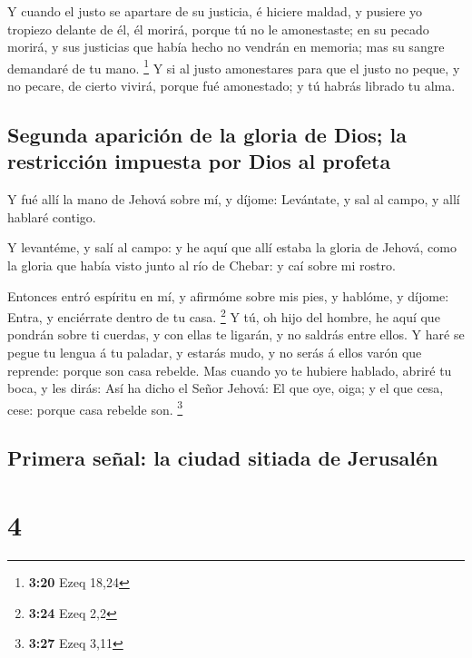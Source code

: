  Y cuando el justo se apartare de su justicia, é hiciere
maldad, y pusiere yo tropiezo delante de él, él morirá, porque tú no le
amonestaste; en su pecado morirá, y sus justicias que había hecho no
vendrán en memoria; mas su sangre demandaré de tu mano. \footnote{\textbf{3:20}
  Ezeq 18,24}  Y si al justo amonestares para que el
justo no peque, y no pecare, de cierto vivirá, porque fué amonestado; y
tú habrás librado tu alma.

\hypertarget{segunda-apariciuxf3n-de-la-gloria-de-dios-la-restricciuxf3n-impuesta-por-dios-al-profeta}{%
\subsection{Segunda aparición de la gloria de Dios; la restricción
impuesta por Dios al
profeta}\label{segunda-apariciuxf3n-de-la-gloria-de-dios-la-restricciuxf3n-impuesta-por-dios-al-profeta}}

 Y fué allí la mano de Jehová sobre mí, y díjome:
Levántate, y sal al campo, y allí hablaré contigo.

 Y levantéme, y salí al campo: y he aquí que allí estaba
la gloria de Jehová, como la gloria que había visto junto al río de
Chebar: y caí sobre mi rostro.

 Entonces entró espíritu en mí, y afirmóme sobre mis
pies, y hablóme, y díjome: Entra, y enciérrate dentro de tu casa.
\footnote{\textbf{3:24} Ezeq 2,2}  Y tú, oh hijo del
hombre, he aquí que pondrán sobre ti cuerdas, y con ellas te ligarán, y
no saldrás entre ellos.  Y haré se pegue tu lengua á tu
paladar, y estarás mudo, y no serás á ellos varón que reprende: porque
son casa rebelde.  Mas cuando yo te hubiere hablado,
abriré tu boca, y les dirás: Así ha dicho el Señor Jehová: El que oye,
oiga; y el que cesa, cese: porque casa rebelde son. \footnote{\textbf{3:27}
  Ezeq 3,11}

\hypertarget{primera-seuxf1al-la-ciudad-sitiada-de-jerusaluxe9n}{%
\subsection{Primera señal: la ciudad sitiada de
Jerusalén}\label{primera-seuxf1al-la-ciudad-sitiada-de-jerusaluxe9n}}

\hypertarget{section-3}{%
\section{4}\label{section-3}}

